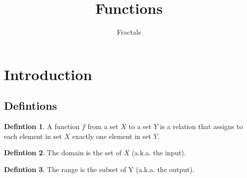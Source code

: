 \documentclass[a4paper]{article}
\theoremstyle{definition}
\newtheorem{definition}{Defintion}[section]
\begin{document}
\author{Fractals}
\title{\textbf{Functions}}
\maketitle
\tableofcontents
\noindent
\section{Introduction}
\subsection{Defintions}

\begin{definition}
    A function \(f\) from a set \(X\) to a set \(Y\) is a relation that assigns to each element in
    set \(X\) exactly one element in set \(Y\).
\end{definition}

\begin{definition}
    The domain is the set of \(X\) (a.k.a. the input).
\end{definition}

\begin{definition}
    The range is the subset of Y (a.k.a. the output).
\end{definition}
\end{document}
